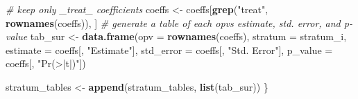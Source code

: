 \documentclass[
]{article}
\newenvironment{Shaded}{\begin{snugshade}}{\end{snugshade}}
\newcommand{\AttributeTok}[1]{\textcolor[rgb]{0.13,0.29,0.53}{#1}}
\newcommand{\CommentTok}[1]{\textcolor[rgb]{0.56,0.35,0.01}{\textit{#1}}}
\newcommand{\FunctionTok}[1]{\textcolor[rgb]{0.13,0.29,0.53}{\textbf{#1}}}
\newcommand{\NormalTok}[1]{#1}
\newcommand{\OtherTok}[1]{\textcolor[rgb]{0.56,0.35,0.01}{#1}}
\newcommand{\StringTok}[1]{\textcolor[rgb]{0.31,0.60,0.02}{#1}}
\begin{document}
\begin{Shaded}
\begin{Highlighting}[]
  \CommentTok{\# keep only \_treat\_ coefficients}
\NormalTok{  coeffs }\OtherTok{\textless{}{-}}\NormalTok{ coeffs[}\FunctionTok{grep}\NormalTok{(}\StringTok{"treat"}\NormalTok{, }\FunctionTok{rownames}\NormalTok{(coeffs)), ]}
  \CommentTok{\# generate a table of each opv\textquotesingle{}s estimate, std. error, and p{-}value}
\NormalTok{  tab\_sur }\OtherTok{\textless{}{-}} \FunctionTok{data.frame}\NormalTok{(}\AttributeTok{opv =} \FunctionTok{rownames}\NormalTok{(coeffs),}
                        \AttributeTok{stratum =}\NormalTok{ stratum\_i,}
                        \AttributeTok{estimate =}\NormalTok{ coeffs[, }\StringTok{"Estimate"}\NormalTok{], }
                        \AttributeTok{std\_error =}\NormalTok{ coeffs[, }\StringTok{"Std. Error"}\NormalTok{], }
                        \AttributeTok{p\_value =}\NormalTok{ coeffs[, }\StringTok{"Pr(\textgreater{}|t|)"}\NormalTok{])}
  
\NormalTok{  stratum\_tables }\OtherTok{\textless{}{-}} \FunctionTok{append}\NormalTok{(stratum\_tables, }\FunctionTok{list}\NormalTok{(tab\_sur))}
\NormalTok{\}}
\end{Highlighting}
\end{Shaded}
\end{document}
